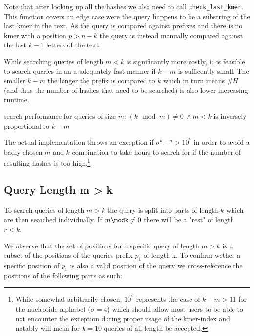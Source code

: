 Note that after looking up all the hashes we also need to call \lstinline{check_last_kmer}. This function covers an
edge case were the query happens to be a substring of the last kmer in the text. As the query is compared
against prefixes and there is no kmer with a position $p>n-k$ the query is instead
manually compared against the last $k-1$ letters of the text.

While searching queries of length $m<k$ is significantly more costly, it is feasible to search queries in an a
adequately fast manner if $k-m$ is sufficently small. The smaller $k-m$ the longer the prefix is compared to $k$ which
in turn means $\#H$ (and thus the number of hashes that need to be searched) is also lower increasing runtime.

\begin{lem}
\label{Lemma 2}
search performance for queries of size $m:\,(k\mod m)\neq0\:\land m<k$ is inversely proportional to $k-m$
\end{lem}

The actual implementation throws an exception if $\sigma^{k-m}>10^{7}$ in order to avoid a badly chosen $m$ and $k$
combination to take hours to search for if the number of resulting hashes is too high.\footnote{While somewhat arbitrarily
chosen, $10^{7}$ represents the case of $k-m>11$ for the nucleotide alphabet ($\sigma=4$) which should allow most users
to be able to not encounter the exception during proper usage of the kmer-index and notably will mean for $k=10$ queries
of all length be accepted.}

\subsection{Query Length m > k}

To search queries of length $m>k$ the query is split into parts of length $k$ which are then searched individually.
If $m\modk\neq0$ there will be a "rest" of length $r<k$.

We observe that the set of positions for a specific query of length $m>k$ is a subset of the positions of the queries
prefix $p_{1}$ of length k. To confirm wether a specific position of $p_{1}$ is also a valid position of the query we
cross-reference the positions of the following parts as such:

